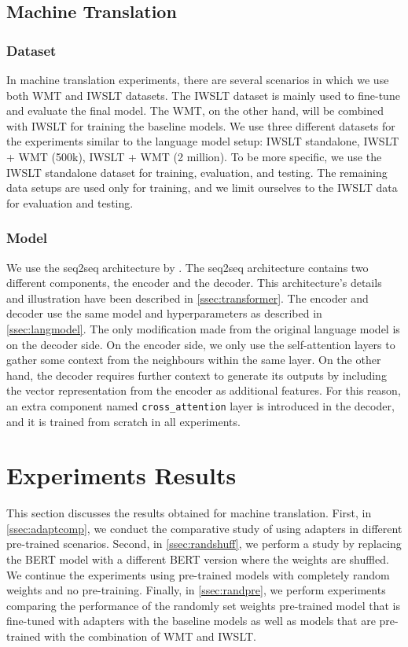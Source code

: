 \subsection{Machine Translation}
\subsubsection{Dataset}
In machine translation experiments, there are several scenarios in which we use both WMT and IWSLT datasets. The IWSLT dataset is mainly used to fine-tune and evaluate the final model. The WMT, on the other hand, will be combined with IWSLT for training the baseline models. We use three different datasets for the experiments similar to the language model setup: IWSLT standalone, IWSLT + WMT (500k), IWSLT + WMT (2 million). To be more specific, we use the IWSLT standalone dataset for training, evaluation, and testing. The remaining data setups are used only for training, and we limit ourselves to the IWSLT data for evaluation and testing.

\subsubsection{Model}
We use the seq2seq architecture by \cite{vaswani2017attention}. The seq2seq architecture contains two different components, the encoder and the decoder. This architecture's details and illustration have been described in \cref{ssec:transformer}. The encoder and decoder use the same model and hyperparameters as described in \cref{ssec:langmodel}. The only modification made from the original language model is on the decoder side. On the encoder side, we only use the self-attention layers to gather some context from the neighbours within the same layer. On the other hand, the decoder requires further context to generate its outputs by including the vector representation from the encoder as additional features. For this reason, an extra component named \texttt{cross\_attention} layer is introduced in the decoder, and it is trained from scratch in all experiments.

\section{Experiments Results}
This section discusses the results obtained for machine translation. First, in \cref{ssec:adaptcomp}, we conduct the comparative study of using adapters in different pre-trained scenarios. Second, in \cref{ssec:randshuff}, we perform a study by replacing the BERT model with a different BERT version where the weights are shuffled. We continue the experiments using pre-trained models with completely random weights and no pre-training. Finally, in \cref{ssec:randpre}, we perform experiments comparing the performance of the randomly set weights pre-trained model that is fine-tuned with adapters with the baseline models as well as models that are pre-trained with the combination of WMT and IWSLT.

